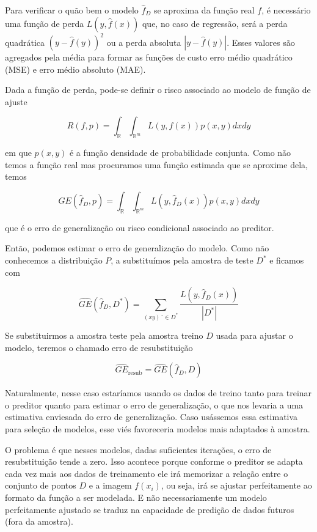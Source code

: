 \documentclass[
  12pt,
  oneside,
  a4paper,
  chapter=TITLE,
  section=TITLE,
  brazil]{abntex2}
\begin{document}
Para verificar o quão bem o modelo \(\hat{f}_D\) se aproxima da função
real \(f\), é necessário uma função de perda \(L(y, \hat{f}(x))\) que,
no caso de regressão, será a perda quadrática \((y - \hat{f}(y))^2\) ou
a perda absoluta \(|y - \hat{f}(y)|\). Esses valores são agregados pela
média para formar as funções de custo erro médio quadrático (MSE) e erro
médio absoluto (MAE).

Dada a função de perda, pode-se definir o risco associado ao modelo de
função de ajuste

\[R(f, p) = \int_{\mathbb{R}}{}\int_{\mathbb{R}^m}{} L(y, f(x))p(x, y)dxdy\]

em que \(p(x, y)\) é a função densidade de probabilidade conjunta. Como
não temos a função real mas procuramos uma função estimada que se
aproxime dela, temos

\[GE(\hat{f}_D, p) = \int_{\mathbb{R}}{}\int_{\mathbb{R}^m}{} L(y, \hat{f}_D(x))p(x, y)dxdy \tag{1}\]

que é o erro de generalização ou risco condicional associado ao
preditor.

Então, podemos estimar o erro de generalização do modelo. Como não
conhecemos a distribuição \(P\), a substituímos pela amostra de teste
\(D^*\) e ficamos com

\[\widehat{GE}(\hat{f}_D, D^*) = \sum_{(xy)´ \in D^*} \frac{L(y, \hat{f}_D(x))}{|D^*|}\]

Se substituirmos a amostra teste pela amostra treino \(D\) usada para
ajustar o modelo, teremos o chamado erro de resubstituição

\[\widehat{GE}_\text{resub} = \widehat{GE}(\hat{f}_D, D)\]

Naturalmente, nesse caso estaríamos usando os dados de treino tanto para
treinar o preditor quanto para estimar o erro de generalização, o que
nos levaria a uma estimativa enviesada do erro de generalização. Caso
usássemos essa estimativa para seleção de modelos, esse viés favoreceria
modelos mais adaptados à amostra.

O problema é que nesses modelos, dadas suficientes iterações, o erro de
resubstituição tende a zero. Isso acontece porque conforme o preditor se
adapta cada vez mais aos dados de treinamento ele irá memorizar a
relação entre o conjunto de pontos \(D\) e a imagem \(f(x_i)\), ou seja,
irá se ajustar perfeitamente ao formato da função a ser modelada. E não
necessariamente um modelo perfeitamente ajustado se traduz na capacidade
de predição de dados futuros (fora da amostra).
\end{document}
